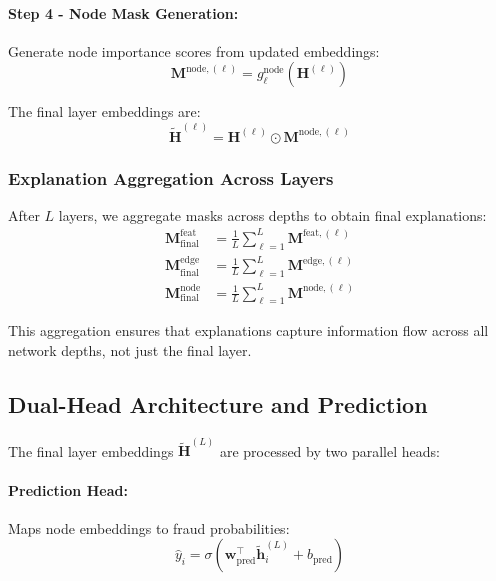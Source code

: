 \paragraph{Step 4 - Node Mask Generation:} Generate node importance scores from updated embeddings:
\begin{equation}
    \mathbf{M}^{\text{node},(\ell)} = g^{\text{node}}_\ell(\mathbf{H}^{(\ell)})
\end{equation}

The final layer embeddings are:
\begin{equation}
    \tilde{\mathbf{H}}^{(\ell)} = \mathbf{H}^{(\ell)} \odot \mathbf{M}^{\text{node},(\ell)}
\end{equation}

\subsubsection{Explanation Aggregation Across Layers}

After $L$ layers, we aggregate masks across depths to obtain final explanations:
\begin{align}
    \mathbf{M}^{\text{feat}}_{\text{final}} &= \frac{1}{L} \sum_{\ell=1}^{L} \mathbf{M}^{\text{feat},(\ell)} \\
    \mathbf{M}^{\text{edge}}_{\text{final}} &= \frac{1}{L} \sum_{\ell=1}^{L} \mathbf{M}^{\text{edge},(\ell)} \\
    \mathbf{M}^{\text{node}}_{\text{final}} &= \frac{1}{L} \sum_{\ell=1}^{L} \mathbf{M}^{\text{node},(\ell)}
\end{align}

This aggregation ensures that explanations capture information flow across all network depths, not just the final layer.

\subsection{Dual-Head Architecture and Prediction}
\label{subsec:dual_head}

The final layer embeddings $\tilde{\mathbf{H}}^{(L)}$ are processed by two parallel heads:

\paragraph{Prediction Head:} Maps node embeddings to fraud probabilities:
\begin{equation}
    \hat{y}_i = \sigma(\mathbf{w}_{\text{pred}}^\top \tilde{\mathbf{h}}^{(L)}_i + b_{\text{pred}})
\end{equation}

